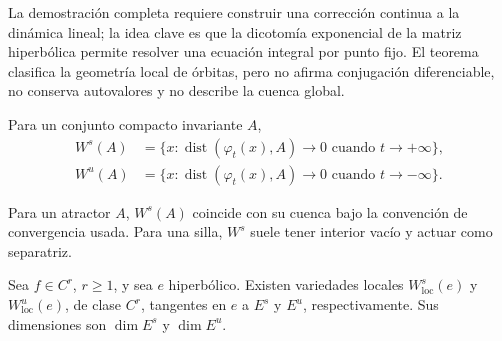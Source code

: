 La demostración completa requiere construir una corrección continua a la
dinámica lineal; la idea clave es que la dicotomía exponencial de la matriz
hiperbólica permite resolver una ecuación integral por punto fijo. El teorema
clasifica la geometría local de órbitas, pero no afirma conjugación
diferenciable, no conserva autovalores y no describe la cuenca global.

\begin{definition}
Para un conjunto compacto invariante \(A\),
\begin{align}
 W^s(A)&=\{x:\operatorname{dist}(\varphi_t(x),A)\to0
                    \text{ cuando }t\to+\infty\},\nonumber\\
 W^u(A)&=\{x:\operatorname{dist}(\varphi_t(x),A)\to0
                    \text{ cuando }t\to-\infty\}.
 \label{geo:eq:stable-unstable-sets}
\end{align}
\end{definition}

Para un atractor \(A\), \(W^s(A)\) coincide con su cuenca bajo la convención
de convergencia usada. Para una silla, \(W^s\) suele tener interior vacío y
actuar como separatriz.

\begin{proposition}
Sea \(f\in C^r\), \(r\ge1\), y sea \(e\) hiperbólico. Existen variedades
locales \(W^s_{\mathrm{loc}}(e)\) y \(W^u_{\mathrm{loc}}(e)\), de clase
\(C^r\), tangentes en \(e\) a \(E^s\) y \(E^u\), respectivamente. Sus
dimensiones son \(\dim E^s\) y \(\dim E^u\).
\end{proposition}

